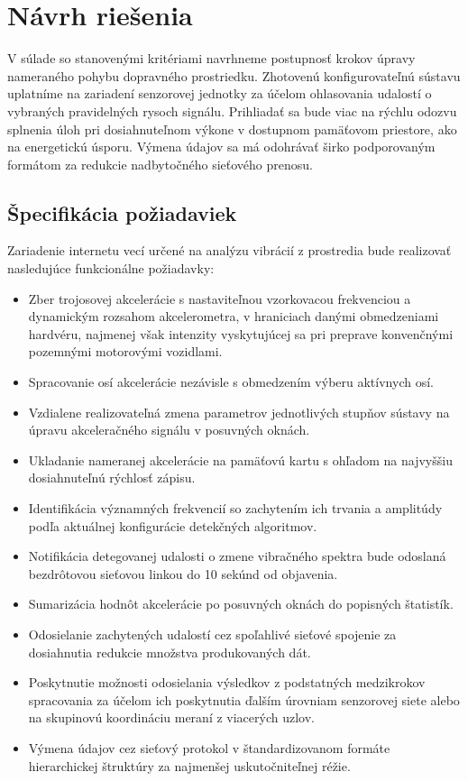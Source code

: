 \chapter{Návrh riešenia} \label{chapter:design}
V súlade so stanovenými kritériami navrhneme postupnosť krokov úpravy nameraného pohybu dopravného prostriedku.
Zhotovenú konfigurovateľnú sústavu uplatníme na zariadení senzorovej jednotky za účelom ohlasovania udalostí
o vybraných pravidelných rysoch signálu. Prihliadať sa bude viac na rýchlu odozvu splnenia úloh pri
dosiahnuteľnom výkone v dostupnom pamäťovom priestore, ako na energetickú úsporu. Výmena údajov sa má
odohrávať širko podporovaným formátom za redukcie nadbytočného sieťového prenosu.

\section{Špecifikácia požiadaviek}
Zariadenie internetu vecí určené na analýzu vibrácií z prostredia bude realizovať nasledujúce funkcionálne požiadavky:
\begin{itemize}[noitemsep,topsep=0pt]
\item Zber trojosovej akcelerácie s nastaviteľnou vzorkovacou frekvenciou a dynamickým rozsahom akcelerometra, v hraniciach danými
obmedzeniami hardvéru, najmenej však intenzity vyskytujúcej sa pri preprave konvenčnými pozemnými motorovými vozidlami.
\item Spracovanie osí akcelerácie nezávisle s obmedzením výberu aktívnych osí.
\item Vzdialene realizovateľná zmena parametrov jednotlivých stupňov sústavy na úpravu akceleračného signálu v posuvných oknách.
\item Ukladanie nameranej akcelerácie na pamäťovú kartu s ohľadom na najvyššiu dosiahnuteľnú rýchlosť zápisu.
\item Identifikácia významných frekvencií so zachytením ich trvania a amplitúdy podľa aktuálnej
konfigurácie detekčných algoritmov.
\item Notifikácia detegovanej udalosti o zmene vibračného spektra bude odoslaná bezdrôtovou sieťovou linkou do 10 sekúnd od objavenia.
\item Sumarizácia hodnôt akcelerácie po posuvných oknách do popisných štatistík.
\item Odosielanie zachytených udalostí cez spoľahlivé sieťové spojenie za dosiahnutia redukcie množstva produkovaných dát.
\item Poskytnutie možnosti odosielania výsledkov z podstatných medzikrokov spracovania za účelom ich poskytnutia
ďalším úrovniam senzorovej siete alebo na skupinovú koordináciu meraní z viacerých uzlov.
\item Výmena údajov cez sieťový protokol v štandardizovanom formáte hierarchickej štruktúry za najmenšej uskutočniteľnej réžie.
\end{itemize}
\bigskip

